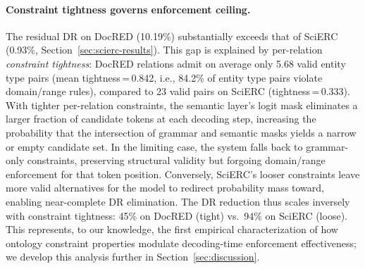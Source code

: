 \paragraph{Constraint tightness governs enforcement ceiling.}
The residual DR on DocRED (10.19\%) substantially exceeds that of
SciERC (0.93\%, Section~\ref{sec:scierc-results}).
This gap is explained by per-relation \emph{constraint tightness}:
DocRED relations admit on average only 5.68 valid entity type pairs
(mean tightness\,=\,0.842, i.e., 84.2\% of entity type pairs violate
domain/range rules), compared to 23 valid pairs on SciERC
(tightness\,=\,0.333).
With tighter per-relation constraints, the semantic layer's logit mask
eliminates a larger fraction of candidate tokens at each decoding step,
increasing the probability that the intersection of grammar and
semantic masks yields a narrow or empty candidate set.
In the limiting case, the system falls back to grammar-only constraints,
preserving structural validity but forgoing domain/range enforcement
for that token position.
Conversely, SciERC's looser constraints leave more valid alternatives
for the model to redirect probability mass toward, enabling
near-complete DR elimination.
The DR reduction thus scales inversely with constraint tightness:
45\% on DocRED (tight) vs.\ 94\% on SciERC (loose).
This represents, to our knowledge, the first empirical characterization
of how ontology constraint properties modulate decoding-time enforcement
effectiveness; we develop this analysis further in
Section~\ref{sec:discussion}.
